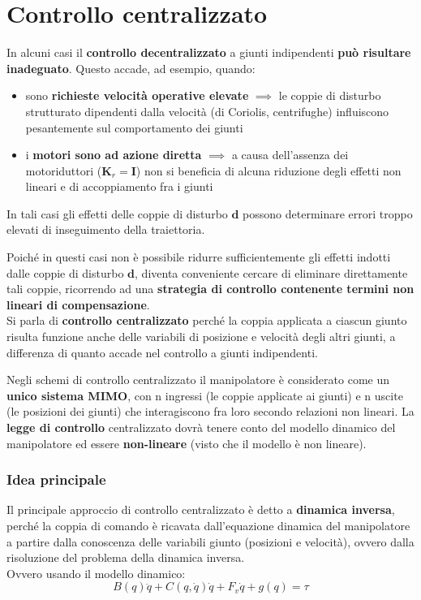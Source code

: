 \section{Controllo centralizzato}

In alcuni casi il \textbf{controllo decentralizzato} a giunti indipendenti \textbf{può risultare inadeguato}. Questo accade, ad esempio, quando:
\begin{itemize}
	\item sono \textbf{richieste velocità operative elevate} $\implies$ le coppie di disturbo strutturato dipendenti dalla velocità (di Coriolis, centrifughe) influiscono pesantemente sul comportamento dei giunti
	\item i \textbf{motori sono ad azione diretta} $\implies$ a causa dell’assenza dei motoriduttori ($\mathbf{K}_r = \mathbf{I}$) non si beneficia di alcuna riduzione degli effetti non lineari e di accoppiamento fra i giunti
\end{itemize}
 
In tali casi gli effetti delle coppie di disturbo $\mathbf{d}$ possono determinare errori troppo elevati di inseguimento della traiettoria.
 
Poiché in questi casi non è possibile ridurre sufficientemente gli effetti indotti dalle coppie di disturbo $\mathbf{d}$, diventa conveniente cercare di eliminare direttamente tali coppie, ricorrendo ad una \textbf{strategia di controllo contenente termini non lineari di compensazione}.\\
Si parla di \textbf{controllo centralizzato} perché la coppia applicata a ciascun giunto risulta funzione anche delle variabili di posizione e velocità degli altri giunti, a differenza di quanto accade nel controllo a giunti indipendenti.
 
Negli schemi di controllo centralizzato il manipolatore è considerato come un \textbf{unico sistema MIMO}, con n ingressi (le coppie applicate ai giunti) e n uscite (le posizioni dei giunti) che interagiscono fra loro secondo relazioni non lineari. La \textbf{legge di controllo} centralizzato dovrà tenere conto del modello dinamico del manipolatore ed essere \textbf{non-lineare} (visto che il modello è non lineare).
 
 
 
\subsubsection{Idea principale}
Il principale approccio di controllo centralizzato è detto a \textbf{dinamica inversa}, perché la coppia di comando è ricavata dall’equazione dinamica del manipolatore a partire dalla conoscenza delle variabili giunto (posizioni e velocità), ovvero dalla risoluzione del problema della dinamica inversa.\\
Ovvero usando il modello dinamico:
\boldmath
$$
B(q)\ddot{q} + C(q, \dot{q})\dot{q} + F_v\dot{q} + g(q) = \tau
$$
\unboldmath


